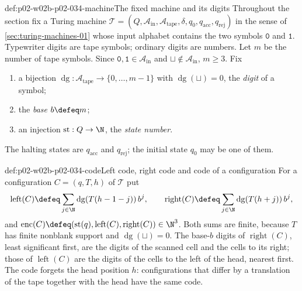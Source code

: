 \begin{hbconvention}{def:p02-w02b-p02-034-machine}{The fixed machine and its digits}
Throughout the section fix a Turing machine
\(\mathcal T=(Q,\mathcal A_{\mathrm{in}},\mathcal A_{\mathrm{tape}},\delta,q_0,q_{\mathrm{acc}},q_{\mathrm{rej}})\)
in the sense of \cref{sec:turing-machines-01} whose input alphabet contains
the two symbols \(\mathtt 0\) and \(\mathtt 1\).  Typewriter digits are tape
symbols; ordinary digits are numbers.  Let \(m\) be the number of tape
symbols.  Since \(\mathtt 0,\mathtt 1\in\mathcal A_{\mathrm{in}}\) and
\(\sqcup\notin\mathcal A_{\mathrm{in}}\), \(m\geq3\).  Fix
\begin{enumerate}
 \item a bijection \(\operatorname{dg}:\mathcal A_{\mathrm{tape}}\to\{0,\ldots,m-1\}\)
   with \(\operatorname{dg}(\sqcup)=0\), the \emph{digit} of a symbol;
 \item the \emph{base} \(b\defeq m\);
 \item an injection \(\operatorname{st}:Q\to\N\), the \emph{state number}.
\end{enumerate}
The halting states are \(q_{\mathrm{acc}}\) and \(q_{\mathrm{rej}}\); the
initial state \(q_0\) may be one of them.
\end{hbconvention}

\begin{hbdefinition}{def:p02-w02b-p02-034-code}{Left code, right code and code of a configuration}
For a configuration \(C=(q,T,h)\) of \(\mathcal T\) put
\[
 \operatorname{left}(C)\defeq\sum_{j\in\N}\operatorname{dg}(T(h-1-j))\,b^j,
 \qquad
 \operatorname{right}(C)\defeq\sum_{j\in\N}\operatorname{dg}(T(h+j))\,b^j,
\]
and \(\operatorname{enc}(C)\defeq(\operatorname{st}(q),\operatorname{left}(C),\operatorname{right}(C))\in\N^3\).
Both sums are finite, because \(T\) has finite nonblank support and
\(\operatorname{dg}(\sqcup)=0\).  The base-\(b\) digits of
\(\operatorname{right}(C)\), least significant first, are the digits of the
scanned cell and the cells to its right; those of \(\operatorname{left}(C)\)
are the digits of the cells to the left of the head, nearest first.  The
code forgets the head position \(h\): configurations that differ by a
translation of the tape together with the head have the same code.
\end{hbdefinition}

